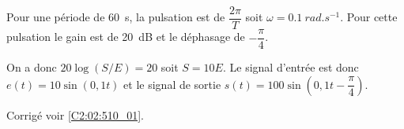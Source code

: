 


\else 


\fi

\ifprof
Pour une période de \SI{60}{s}, la pulsation est de $\dfrac{2\pi}{T}$ soit $\omega = \SI{0,1}{rad.s^{-1}}$.
Pour cette pulsation le gain est de \SI{20}{dB} et le déphasage de $-\dfrac{\pi}{4}$.

On a donc $20\log(S/E) = 20$ soit $S=10E$. Le signal d'entrée est donc $e(t) = 10 \sin (0,1 t)$ et le signal de sortie  $s(t) = 100 \sin\left(0,1 t - \dfrac{\pi}{4}\right)$.
\else
\fi

\ifprof
\else
\begin{flushright}
\footnotesize{Corrigé  voir \ref{C2:02:510_01}.}
\end{flushright}%
\fi